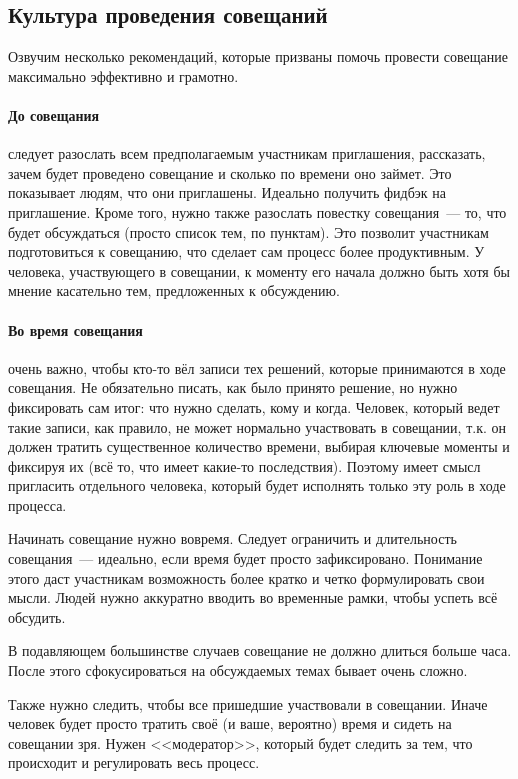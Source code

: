 \documentclass{../../text-style}
\begin{document}
\subsection{Культура проведения совещаний}

Озвучим несколько рекомендаций, которые призваны помочь провести совещание максимально эффективно и грамотно.

\paragraph*{До совещания} следует разослать всем предполагаемым участникам приглашения, рассказать, зачем будет проведено совещание и сколько по времени оно займет. Это показывает людям, что они приглашены. Идеально получить фидбэк на приглашение. Кроме того, нужно также разослать повестку совещания~--- то, что будет обсуждаться (просто список тем, по пунктам). Это позволит участникам подготовиться к совещанию, что сделает сам процесс более продуктивным. У человека, участвующего в совещании, к моменту его начала должно быть хотя бы мнение касательно тем, предложенных к обсуждению.

\paragraph*{Во время совещания} очень важно, чтобы кто-то вёл записи тех решений, которые принимаются в ходе совещания. Не обязательно писать, как было принято решение, но нужно фиксировать сам итог: что нужно сделать, кому и когда. Человек, который ведет такие записи, как правило, не может нормально участвовать в совещании, т.к. он должен тратить существенное количество времени, выбирая ключевые моменты и фиксируя их (всё то, что имеет какие-то последствия). Поэтому имеет смысл пригласить отдельного человека, который будет исполнять только эту роль в ходе процесса.

Начинать совещание нужно вовремя. Следует ограничить и длительность совещания~--- идеально, если время будет просто зафиксировано. Понимание этого даст участникам возможность более кратко и четко формулировать свои мысли. Людей нужно аккуратно вводить во временные рамки, чтобы успеть всё обсудить.

В подавляющем большинстве случаев совещание не должно длиться больше часа. После этого сфокусироваться на обсуждаемых темах бывает очень сложно.

Также нужно следить, чтобы все пришедшие участвовали в совещании. Иначе человек будет просто тратить своё (и ваше, вероятно) время и сидеть на совещании зря. Нужен <<модератор>>, который будет следить за тем, что происходит и регулировать весь процесс.
\end{document}
